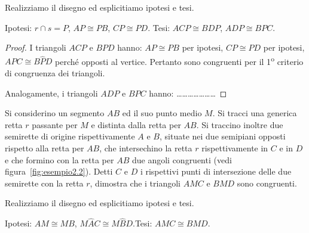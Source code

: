 \begin{exrig}
\begin{esempio}
\begin{multicols}{2}
Realizziamo il disegno ed esplicitiamo ipotesi e tesi.

\noindent Ipotesi: $r\cap s=P$, $AP\cong PB$, $CP\cong PD$.\tab\tab 
Tesi: $ACP\cong BDP$, $ADP\cong BPC$.

\begin{proof}
I triangoli $ACP$ e $BPD$ hanno: $AP\cong PB$ per ipotesi, $CP\cong 
PD$ per ipotesi, $A\widehat{P}C\cong B\widehat{P}D$ perché opposti al 
vertice. Pertanto sono congruenti per il 1\textsuperscript{o} 
criterio di congruenza dei triangoli.
\begin{center}
\begin{inaccessibleblock}

\end{inaccessibleblock}
\end{center}

Analogamente, i triangoli $ADP$ e $BPC$ hanno: 
\ldots\ldots\ldots\ldots\ldots\ldots\ldots
\end{proof}
\end{multicols}

\end{esempio}

\begin{esempio}\label{esempio:2.2}
Si considerino un segmento $AB$ ed il suo punto medio $M$. Si tracci 
una generica retta $r$ passante per $M$ e distinta dalla retta per 
$AB$. Si traccino inoltre due semirette di origine rispettivamente 
$A$ e $B$, situate nei due semipiani opposti rispetto alla retta per 
$AB$, che intersechino la retta $r$ rispettivamente in $C$ e in $D$ e 
che formino con la retta per $AB$ due angoli congruenti (vedi 
figura~\ref{fig:esempio2.2}). Detti $C$ e $D$ i rispettivi punti di 
intersezione delle due semirette con la retta $r$, dimostra che i 
triangoli $AMC$ e $BMD$ sono congruenti.



\begin{multicols}{2}
Realizziamo il disegno ed esplicitiamo ipotesi e tesi.

\noindent Ipotesi: $AM\cong MB$, $M\widehat{A}C\cong 
M\widehat{B}D$.\tab Tesi: $AMC\cong BMD$.


\end{multicols}
\end{esempio}
\end{exrig}
